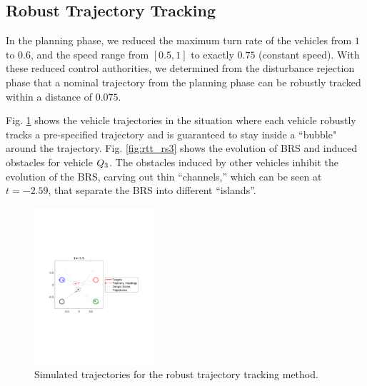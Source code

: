 \subsection{Robust Trajectory Tracking}
In the planning phase, we reduced the maximum turn rate of the vehicles from $1$ to $0.6$, and the speed range from $[0.5, 1]$ to exactly $0.75$ (constant speed). With these reduced control authorities, we determined from the disturbance rejection phase that a nominal trajectory from the planning phase can be robustly tracked within a distance of $0.075$.

Fig. \ref{fig:rtt_traj} shows the vehicle trajectories in the situation where each vehicle robustly tracks a pre-specified trajectory and is guaranteed to stay inside a ``bubble" around the trajectory. Fig. \ref{fig:rtt_rs3} shows the evolution of BRS and induced obstacles for vehicle $Q_3$. The obstacles induced by other vehicles inhibit the evolution of the BRS, carving out thin “channels,” which can be seen at $t = -2.59$, that separate the BRS into different “islands”. %

\begin{figure}[H]
  \centering
  \includegraphics[width=0.40\textwidth]{"fig/rtt_traj"}
  \caption{Simulated trajectories for the robust trajectory tracking method.}
  \label{fig:rtt_traj}
  \vspace{-1em}
\end{figure}

